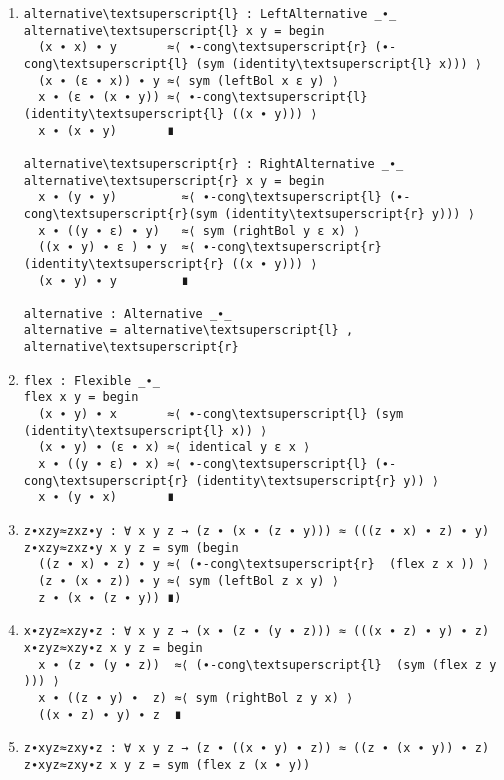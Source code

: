 \begin{enumerate}
\item
\begin{Verbatim}[commandchars=\\\{\},samepage=true]
alternative\textsuperscript{l} : LeftAlternative _∙_
alternative\textsuperscript{l} x y = begin
  (x ∙ x) ∙ y       ≈⟨ ∙-cong\textsuperscript{r} (∙-cong\textsuperscript{l} (sym (identity\textsuperscript{l} x))) ⟩
  (x ∙ (ε ∙ x)) ∙ y ≈⟨ sym (leftBol x ε y) ⟩
  x ∙ (ε ∙ (x ∙ y)) ≈⟨ ∙-cong\textsuperscript{l} (identity\textsuperscript{l} ((x ∙ y))) ⟩
  x ∙ (x ∙ y)       ∎

alternative\textsuperscript{r} : RightAlternative _∙_
alternative\textsuperscript{r} x y = begin
  x ∙ (y ∙ y)         ≈⟨ ∙-cong\textsuperscript{l} (∙-cong\textsuperscript{r}(sym (identity\textsuperscript{r} y))) ⟩
  x ∙ ((y ∙ ε) ∙ y)   ≈⟨ sym (rightBol y ε x) ⟩
  ((x ∙ y) ∙ ε ) ∙ y  ≈⟨ ∙-cong\textsuperscript{r} (identity\textsuperscript{r} ((x ∙ y))) ⟩
  (x ∙ y) ∙ y         ∎

alternative : Alternative _∙_
alternative = alternative\textsuperscript{l} , alternative\textsuperscript{r}
\end{Verbatim}
\item
\begin{Verbatim}[commandchars=\\\{\}]
flex : Flexible _∙_
flex x y = begin
  (x ∙ y) ∙ x       ≈⟨ ∙-cong\textsuperscript{l} (sym (identity\textsuperscript{l} x)) ⟩
  (x ∙ y) ∙ (ε ∙ x) ≈⟨ identical y ε x ⟩
  x ∙ ((y ∙ ε) ∙ x) ≈⟨ ∙-cong\textsuperscript{l} (∙-cong\textsuperscript{r} (identity\textsuperscript{r} y)) ⟩
  x ∙ (y ∙ x)       ∎
\end{Verbatim}
\item
\begin{Verbatim}[commandchars=\\\{\},samepage=true]
z∙xzy≈zxz∙y : ∀ x y z → (z ∙ (x ∙ (z ∙ y))) ≈ (((z ∙ x) ∙ z) ∙ y)
z∙xzy≈zxz∙y x y z = sym (begin
  ((z ∙ x) ∙ z) ∙ y ≈⟨ (∙-cong\textsuperscript{r}  (flex z x )) ⟩
  (z ∙ (x ∙ z)) ∙ y ≈⟨ sym (leftBol z x y) ⟩
  z ∙ (x ∙ (z ∙ y)) ∎)
\end{Verbatim}
\item
\begin{Verbatim}[commandchars=\\\{\},samepage=true]
x∙zyz≈xzy∙z : ∀ x y z → (x ∙ (z ∙ (y ∙ z))) ≈ (((x ∙ z) ∙ y) ∙ z)
x∙zyz≈xzy∙z x y z = begin
  x ∙ (z ∙ (y ∙ z))  ≈⟨ (∙-cong\textsuperscript{l}  (sym (flex z y ))) ⟩
  x ∙ ((z ∙ y) ∙  z) ≈⟨ sym (rightBol z y x) ⟩
  ((x ∙ z) ∙ y) ∙ z  ∎
\end{Verbatim}
\item
\begin{Verbatim}[commandchars=\\\{\},samepage=true]
z∙xyz≈zxy∙z : ∀ x y z → (z ∙ ((x ∙ y) ∙ z)) ≈ ((z ∙ (x ∙ y)) ∙ z)
z∙xyz≈zxy∙z x y z = sym (flex z (x ∙ y))
\end{Verbatim}
\end{enumerate}